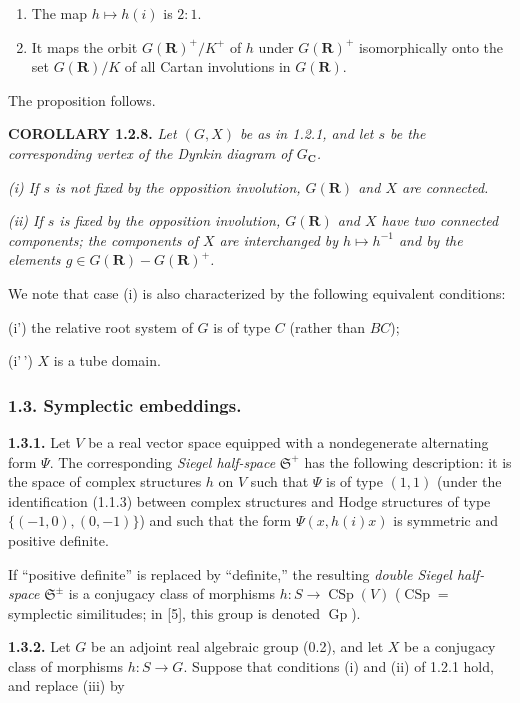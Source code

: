 \documentclass[10pt,a4paper]{article}
\begin{document}
\begin{enumerate}
\def\labelenumi{(\alph{enumi})}
\item
  The map \(h\mapsto h(i)\) is \(2:1\).
\item
  It maps the orbit \(G(\mathbf R)^+/K^+\) of \(h\) under \(G(\mathbf R)^+\) isomorphically onto the set \(G(\mathbf R)/K\) of all Cartan involutions in \(G(\mathbf R)\).
\end{enumerate}

The proposition follows.

\textbf{COROLLARY 1.2.8.} \emph{Let \((G,X)\) be as in 1.2.1, and let \(s\) be the corresponding vertex of the Dynkin diagram of \(G_{\mathbf C}\).}

\emph{(i) If \(s\) is not fixed by the opposition involution, \(G(\mathbf R)\) and \(X\) are connected.}

\emph{(ii) If \(s\) is fixed by the opposition involution, \(G(\mathbf R)\) and \(X\) have two connected components; the components of \(X\) are interchanged by \(h\mapsto h^{-1}\) and by the elements \(g\in G(\mathbf R)-G(\mathbf R)^+\).}

We note that case (i) is also characterized by the following equivalent conditions:

(i') the relative root system of \(G\) is of type \(C\) (rather than \(BC\));

(i'\,') \(X\) is a tube domain.

\subsubsection{1.3. Symplectic embeddings.}

\textbf{1.3.1.} Let \(V\) be a real vector space equipped with a nondegenerate alternating form \(\Psi\). The corresponding \emph{Siegel half-space} \(\mathfrak S^+\) has the following description: it is the space of complex structures \(h\) on \(V\) such that \(\Psi\) is of type \((1,1)\) (under the identification (1.1.3) between complex structures and Hodge structures of type \(\{(-1,0),(0,-1)\}\)) and such that the form \(\Psi(x,h(i)x)\) is symmetric and positive definite.

If ``positive definite'' is replaced by ``definite,'' the resulting \emph{double Siegel half-space} \(\mathfrak S^{\pm}\) is a conjugacy class of morphisms \(h:S\to\operatorname{CSp}(V)\) (\(\operatorname{CSp}=\) symplectic similitudes; in {[}5{]}, this group is denoted \(\operatorname{Gp}\)).

\textbf{1.3.2.} Let \(G\) be an adjoint real algebraic group (0.2), and let \(X\) be a conjugacy class of morphisms \(h:S\to G\). Suppose that conditions (i) and (ii) of 1.2.1 hold, and replace (iii) by
\end{document}
